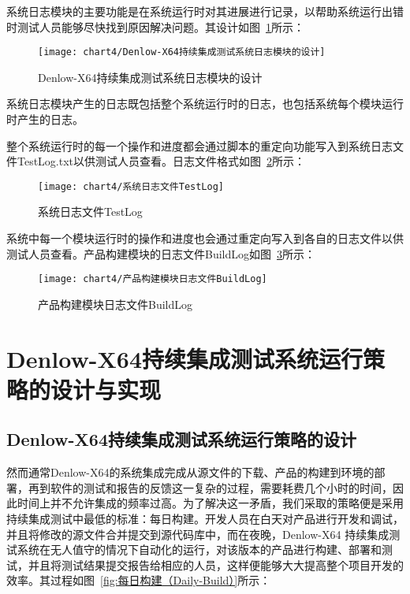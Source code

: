 		系统日志模块的主要功能是在系统运行时对其进展进行记录，以帮助系统运行出错时测试人员能够尽快找到原因解决问题。其设计如图~\ref{fig:Denlow-X64持续集成测试系统日志模块的设计}所示：
		
			\begin{figure}[H] %
				\centering
				\texttt{[image: chart4/Denlow-X64持续集成测试系统日志模块的设计]}
				\caption{Denlow-X64持续集成测试系统日志模块的设计}
				\label{fig:Denlow-X64持续集成测试系统日志模块的设计}
			\end{figure}
		
		系统日志模块产生的日志既包括整个系统运行时的日志，也包括系统每个模块运行时产生的日志。
		
		整个系统运行时的每一个操作和进度都会通过脚本的重定向功能写入到系统日志文件TestLog.txt以供测试人员查看。日志文件格式如图~\ref{fig:系统日志文件TestLog}所示：
		
			\begin{figure}[H] %
				\centering
				\texttt{[image: chart4/系统日志文件TestLog]}
				\caption{系统日志文件TestLog}
				\label{fig:系统日志文件TestLog}
			\end{figure}
		
		系统中每一个模块运行时的操作和进度也会通过重定向写入到各自的日志文件以供测试人员查看。产品构建模块的日志文件BuildLog如图~\ref{fig:产品构建模块日志文件BuildLog}所示：
		
			\begin{figure}[H] %
				\centering
				\texttt{[image: chart4/产品构建模块日志文件BuildLog]}
				\caption{产品构建模块日志文件BuildLog}
				\label{fig:产品构建模块日志文件BuildLog}
			\end{figure}
		
\section{Denlow-X64持续集成测试系统运行策略的设计与实现}
	\subsection{Denlow-X64持续集成测试系统运行策略的设计}
		
		然而通常Denlow-X64的系统集成完成从源文件的下载、产品的构建到环境的部署，再到软件的测试和报告的反馈这一复杂的过程，需要耗费几个小时的时间，因此时间上并不允许集成的频率过高。为了解决这一矛盾，我们采取的策略便是采用持续集成测试中最低的标准：每日构建。开发人员在白天对产品进行开发和调试，并且将修改的源文件合并提交到源代码库中，而在夜晚，Denlow-X64 持续集成测试系统在无人值守的情况下自动化的运行，对该版本的产品进行构建、部署和测试，并且将测试结果提交报告给相应的人员，这样便能够大大提高整个项目开发的效率。其过程如图~\ref{fig:每日构建（Daily-Build）}所示：
		
